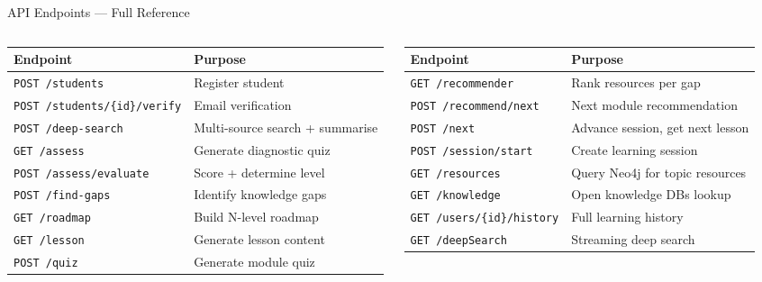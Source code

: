 \documentclass[aspectratio=169,12pt]{beamer}
\begin{document}
\begin{frame}{API Endpoints — Full Reference}
  \begin{columns}
      \begin{table}\footnotesize
        \begin{tabular}{lp{4.2cm}}
          \toprule
          \textbf{Endpoint} & \textbf{Purpose} \\
          \midrule
          \texttt{POST /students}         & Register student \\
          \texttt{POST /students/\{id\}/verify} & Email verification \\
          \texttt{POST /deep-search}      & Multi-source search + summarise \\
          \texttt{GET  /assess}           & Generate diagnostic quiz \\
          \texttt{POST /assess/evaluate}  & Score + determine level \\
          \texttt{POST /find-gaps}        & Identify knowledge gaps \\
          \texttt{GET  /roadmap}          & Build N-level roadmap \\
          \texttt{GET  /lesson}           & Generate lesson content \\
          \texttt{POST /quiz}             & Generate module quiz \\
          \bottomrule
        \end{tabular}
      \end{table}
      \begin{table}\footnotesize
        \begin{tabular}{lp{4.2cm}}
          \toprule
          \textbf{Endpoint} & \textbf{Purpose} \\
          \midrule
          \texttt{GET  /recommender}      & Rank resources per gap \\
          \texttt{POST /recommend/next}   & Next module recommendation \\
          \texttt{POST /next}             & Advance session, get next lesson \\
          \texttt{POST /session/start}    & Create learning session \\
          \texttt{GET  /resources}        & Query Neo4j for topic resources \\
          \texttt{GET  /knowledge}        & Open knowledge DBs lookup \\
          \texttt{GET  /users/\{id\}/history} & Full learning history \\
          \texttt{GET  /deepSearch}       & Streaming deep search \\
          \bottomrule
        \end{tabular}
      \end{table}
  \end{columns}
\end{frame}
\end{document}
